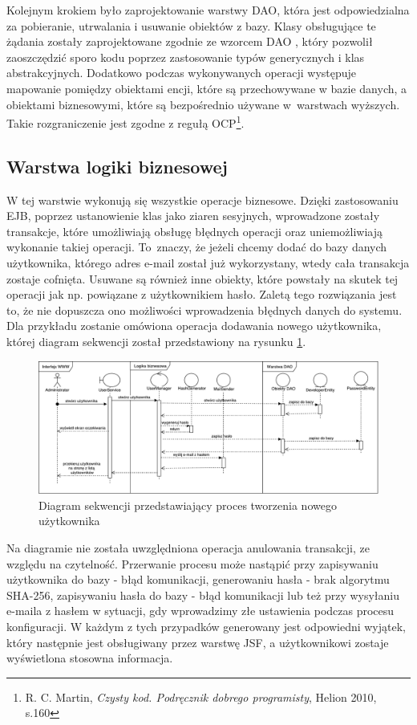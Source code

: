 Kolejnym krokiem było zaprojektowanie warstwy DAO, która jest odpowiedzialna za pobieranie, utrwalania i usuwanie obiektów z bazy. Klasy obsługujące te żądania zostały zaprojektowane zgodnie ze wzorcem DAO \cite{J2EE}\cite{WZORCE}, który pozwolił zaoszczędzić sporo kodu poprzez zastosowanie typów generycznych i klas abstrakcyjnych. Dodatkowo podczas wykonywanych operacji występuje mapowanie pomiędzy obiektami encji, które są przechowywane w bazie danych, a obiektami biznesowymi, które są bezpośrednio używane w~warstwach wyższych. Takie rozgraniczenie jest zgodne z regułą OCP\footnote{R. C. Martin, \textit{Czysty kod. Podręcznik dobrego programisty}, Helion 2010, s.160}.


\subsection{Warstwa logiki biznesowej}
W tej warstwie wykonują się wszystkie operacje biznesowe. Dzięki zastosowaniu EJB, poprzez ustanowienie klas jako ziaren sesyjnych, wprowadzone zostały transakcje, które umożliwiają obsługę błędnych operacji oraz uniemożliwiają wykonanie takiej operacji. To~znaczy, że jeżeli chcemy dodać do bazy danych użytkownika, którego adres e-mail został już wykorzystany, wtedy cała transakcja zostaje cofnięta. Usuwane są również inne obiekty, które powstały na skutek tej operacji jak np. powiązane z użytkownikiem hasło. Zaletą tego rozwiązania jest to, że nie dopuszcza ono możliwości wprowadzenia błędnych danych do systemu. Dla przykładu zostanie omówiona operacja dodawania nowego użytkownika, której diagram sekwencji został przedstawiony na rysunku \ref{fig:diagsekw}. 

\begin{figure}
	\centering
	\includegraphics[width=25cm]{rysunki/diagsekw.pdf}	
	\caption{Diagram sekwencji przedstawiający proces tworzenia nowego użytkownika}
	\label{fig:diagsekw}
\end{figure}

Na diagramie nie została uwzględniona operacja anulowania transakcji, ze względu na czytelność. Przerwanie procesu może nastąpić przy zapisywaniu użytkownika do bazy - błąd komunikacji, generowaniu hasła - brak algorytmu SHA-256, zapisywaniu hasła do bazy - błąd komunikacji lub też przy wysyłaniu e-maila z hasłem w sytuacji, gdy wprowadzimy złe ustawienia podczas procesu konfiguracji. W każdym z tych przypadków generowany jest odpowiedni wyjątek, który następnie jest obsługiwany przez warstwę JSF, a użytkownikowi zostaje wyświetlona stosowna informacja.

